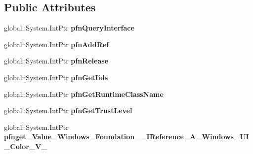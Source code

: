 \subsection*{Public Attributes}
\begin{DoxyCompactItemize}
\item 
\mbox{\label{struct_system_1_1_nullable___a___windows___u_i___color___v_______impl_1_1_vtbl_a21b9c3cb36f89058075cade2ec4bfe98}} 
global\+::\+System.\+Int\+Ptr {\bfseries pfn\+Query\+Interface}
\item 
\mbox{\label{struct_system_1_1_nullable___a___windows___u_i___color___v_______impl_1_1_vtbl_a900425f6f9e361f91d09a27c9c7238b6}} 
global\+::\+System.\+Int\+Ptr {\bfseries pfn\+Add\+Ref}
\item 
\mbox{\label{struct_system_1_1_nullable___a___windows___u_i___color___v_______impl_1_1_vtbl_a65f565035a43ab9883956545c41b2dc9}} 
global\+::\+System.\+Int\+Ptr {\bfseries pfn\+Release}
\item 
\mbox{\label{struct_system_1_1_nullable___a___windows___u_i___color___v_______impl_1_1_vtbl_a470a58ed501c15d972b832eae12b2dd7}} 
global\+::\+System.\+Int\+Ptr {\bfseries pfn\+Get\+Iids}
\item 
\mbox{\label{struct_system_1_1_nullable___a___windows___u_i___color___v_______impl_1_1_vtbl_a81d663f5bd93886b4212da521b624ad0}} 
global\+::\+System.\+Int\+Ptr {\bfseries pfn\+Get\+Runtime\+Class\+Name}
\item 
\mbox{\label{struct_system_1_1_nullable___a___windows___u_i___color___v_______impl_1_1_vtbl_a82571d10838014dbe269463341b28618}} 
global\+::\+System.\+Int\+Ptr {\bfseries pfn\+Get\+Trust\+Level}
\item 
\mbox{\label{struct_system_1_1_nullable___a___windows___u_i___color___v_______impl_1_1_vtbl_a791d7d837d8270e6caddb52abc17ac2b}} 
global\+::\+System.\+Int\+Ptr {\bfseries pfnget\+\_\+\+Value\+\_\+\+Windows\+\_\+\+Foundation\+\_\+\+\_\+\+I\+Reference\+\_\+\+A\+\_\+\+Windows\+\_\+\+U\+I\+\_\+\+Color\+\_\+\+V\+\_\+}
\end{DoxyCompactItemize}
